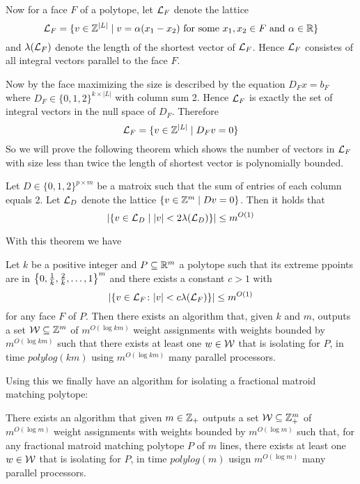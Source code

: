 Now for a face $F$ of a polytope, let $\mathcal{L}_F$ denote the lattice $$\mathcal{L}_F=\{v\in\mathbb{Z}^{|L|}\mid v=\alpha(x_1-x_2)\text{  for some $x_1,x_2\in F$ and $\alpha\in\mathbb{R}$}\}$$and $\lambda(\mathcal{L}_F)$ denote the length of the shortest vector of $\mathcal{L}_F$. Hence $\mathcal{L}_F$ consistes of all integral vectors parallel to the face $F$.

Now by  the face maximizing the size is described by the equation $D_Fx=b_F$ where $D_F\in \{0,1,2\}^{k\times |L|}$ with column sum 2. Hence $\mathcal{L}_F$ is exactly the set of integral vectors in the null space of $D_F$. Therefore $$\mathcal{L}_F=\{v\in\mathbb{Z}^{|L|}\mid D_Fv=0\}$$So we will prove the following theorem which shows the number of vectors in $\mathcal{L}_F$ with size less than twice the length of shortest vector is polynomially bounded.
\begin{Theorem}{\cite{gurjarfrac}}{}
	Let $D\in \{0,1,2\}^{p\times m}$ be a matroix such that the sum of entries of each column equals 2. Let $\mathcal{L}_D$ denote the lattice $\{v\in\mathbb{Z}^m\mid Dv=0\}$. Then it holds that $$|\{v\in \mathcal{L}_D\mid |v|<2\lambda(\mathcal{L}_D)\}|\leq m^{O(1)}$$
\end{Theorem}

With this theorem we have \begin{Theorem}{\cite[Theorem 2.5]{gurjarisolating}}{}
	Let $k$ be a positive integer and $P\subseteq \mathbb{R}^{m}$ a polytope such that its extreme ppoints are in $\left\{0,\frac1k,\frac2k,\dots,1\right\}^m$ and there exists a constant $c>1$ with $$|\{v\in \mathcal{L}_F\colon |v|<c\lambda(\mathcal{L}_F)\}|\leq m^{O(1)}$$ for any face $F$ of $P$. Then there exists an algorithm that, given $k$ and $m$, outputs a set $\mathcal{W}\subseteq \mathbb{Z}^m$ of $m^{O(\log km)}$ weight assignments with weights bounded by $m^{O(\log km)}$ such that there exists at least one $w\in \mathcal{W}$ that is isolating for $P$, in time $polylog(km)$ using $m^{O(\log km)}$ many parallel processors.
\end{Theorem}
Using this we finally have an algorithm for isolating a fractional matroid matching polytope:
\begin{Theorem}{\cite[Theorem 3.1]{gurjarfrac}}{}
	There exists an algorithm that given $m\in \mathbb{Z}_+$ outputs a set $\mathcal{W}\subseteq \mathbb{Z}^m_+$ of $m^{O(\log m)}$ weight assignments with weights bounded by $m^{O(\log m)}$ such that, for any fractional matroid matching polytope $P$ of $m$ lines, there exists at least one $w\in \mathcal{W}$ that is isolating for $P$, in time $polylog(m)$ usign $m^{O(\log m)}$ many parallel processors.
\end{Theorem}